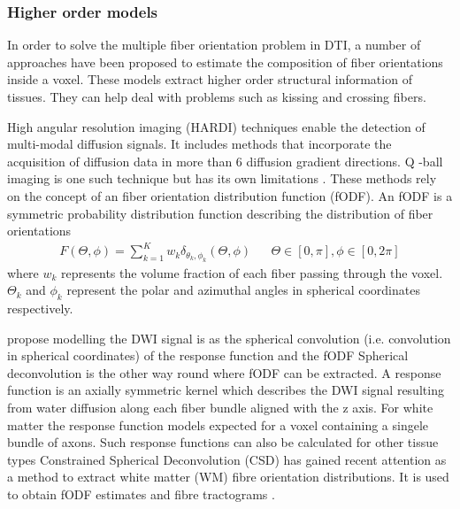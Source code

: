 \documentclass[msthesis.tex]{subfiles}
\begin{document}
\subsubsection{Higher order models}

In order to solve the multiple fiber orientation problem in DTI, a number of approaches have been proposed to estimate the composition of fiber orientations inside a voxel. These models extract higher order structural information of tissues. They can help deal with problems such as kissing and crossing fibers. 

High angular resolution imaging (HARDI) techniques enable the detection of multi-modal diffusion signals. It includes methods that incorporate the acquisition of diffusion data in more than 6 diffusion gradient directions. Q -ball imaging is one such technique but has its own limitations \cite{TOURNIER20041176}. These methods rely on the concept of an fiber orientation distribution function (fODF). An fODF is a symmetric probability distribution function describing the distribution of fiber orientations
\begin{align}
  F(\Theta, \phi) = \sum_{k=1}^{K} w_k \delta_{\theta_k, \phi_k}(\Theta, \phi) &
 & \Theta \in [0, \pi], \phi \in [0,2\pi]
\end{align}
where $w_k$ represents the volume fraction of each fiber passing through the voxel. $\Theta_k$ and $\phi_k$ represent the polar and azimuthal angles in spherical coordinates respectively.

 \cite{tournier2004direct} propose modelling the DWI signal is as the spherical convolution (i.e. convolution in spherical coordinates) of the response function and the fODF Spherical deconvolution is the other way round where fODF can be extracted. A response function is an axially symmetric kernel which describes the DWI signal resulting from water diffusion along each fiber bundle aligned with the z axis. For white matter the response function models expected for a voxel containing a singele bundle of axons. Such response functions can also be calculated for other tissue types
Constrained Spherical Deconvolution (CSD) has gained recent attention as a method to extract white matter (WM) fibre orientation distributions. It is used to obtain fODF estimates and fibre tractograms \cite{JEURISSEN2014411}.
\end{document}
